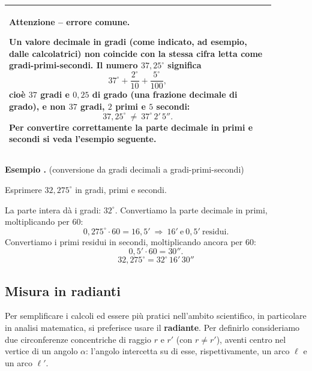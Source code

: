 \documentclass[11pt,a4paper]{article}
\newcounter{esempio}[section]
\newenvironment{esempio}[1][]{%
  \refstepcounter{esempio}%
  \par\vspace{4pt}\noindent
  \textbf{\color{blue!60!black}Esempio \theesempio.} #1\ \par\nobreak
  \begingroup\color{black}
}{%
  \endgroup\par\vspace{4pt}
}
\newenvironment{attenzione}{%
  \par\vspace{4pt}\noindent
  \begin{center}
  \begin{tabular}{|p{0.88\linewidth}|}
  \hline
  \rule{0pt}{2.3ex}\textbf{\color{red!70!black}Attenzione -- errore comune.}\ \ignorespaces
}{%
  \\[2pt]\hline
  \end{tabular}
  \end{center}
  \par\vspace{4pt}
}
\begin{document}
\begin{attenzione}
Un valore decimale in gradi (come indicato, ad esempio, dalle calcolatrici) \textbf{non} coincide con la stessa cifra letta come gradi-primi-secondi. Il numero $37{,}25^\circ$ significa
\[
37^\circ + \frac{2^\circ}{10} + \frac{5^\circ}{100},
\]
cio\`e $37$ gradi e $0{,}25$ di grado (una frazione decimale di grado), e \textbf{non} $37$ gradi, $2$ primi e $5$ secondi:
\[
37{,}25^\circ \ \neq\ 37^\circ\,2'\,5''.
\]
Per convertire correttamente la parte decimale in primi e secondi si veda l'esempio seguente.
\end{attenzione}

\begin{esempio}[(conversione da gradi decimali a gradi-primi-secondi)]
Esprimere $32{,}275^\circ$ in gradi, primi e secondi.

\vspace{2pt}
\noindent La parte intera d\`a i gradi: $32^\circ$. Convertiamo la parte decimale in primi, moltiplicando per $60$:
\[
0{,}275^\circ \cdot 60 = 16{,}5' \ \Longrightarrow\ 16'\ \text{e}\ 0{,}5'\ \text{residui.}
\]
Convertiamo i primi residui in secondi, moltiplicando ancora per $60$:
\[
0{,}5' \cdot 60 = 30''.
\]
\[
\boxed{32{,}275^\circ = 32^\circ\,16'\,30''}
\]
\end{esempio}

\subsection{Misura in radianti}

Per semplificare i calcoli ed essere pi\`u pratici nell'ambito scientifico, in particolare in analisi matematica, si preferisce usare il \textbf{radiante}. Per definirlo consideriamo due circonferenze concentriche di raggio $r$ e $r'$ (con $r \neq r'$), aventi centro nel vertice di un angolo $\alpha$: l'angolo intercetta su di esse, rispettivamente, un arco $\ell$ e un arco $\ell'$.

\begin{center}
\end{center}
\end{document}
